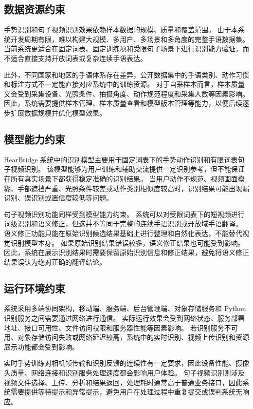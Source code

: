 \subsection{数据资源约束}

手势识别和句子视频识别效果依赖样本数据的规模、质量和覆盖范围。
由于本系统开发周期有限，难以构建大规模、多用户、多场景和多角度的完整手语数据集。
当前系统更适合在固定词表、固定训练项和受限句子场景下进行识别能力验证，而不适合直接支持开放词表或复杂连续手语表达。

此外，不同国家和地区的手语体系存在差异，公开数据集中的手语类别、动作习惯和标注方式不一定能直接对应系统中的训练资源。
对于自采样本而言，样本质量又会受到采集设备、光照条件、拍摄角度、动作规范程度和采集人数等因素影响。
因此，系统需要提供样本管理、样本质量查看和模型版本管理等能力，以便后续逐步扩展数据规模并优化模型效果。

\subsection{模型能力约束}

HearBridge 系统中的识别模型主要用于固定词表下的手势动作识别和有限词表句子视频识别。
该模型能够为用户训练和辅助交流提供一定识别参考，但不能保证在所有真实场景下都获得稳定准确的识别结果。
当用户动作不规范、视频画面模糊、手部遮挡严重、光照条件较差或动作类别相似度较高时，识别结果可能出现漏识别、误识别或置信度较低等问题。

句子视频识别功能同样受到模型能力约束。
系统可以对受限词表下的短视频进行词级识别和语义修正，但这并不等同于完整的连续手语识别或开放域手语翻译。
语义修正功能只能在原始识别候选结果基础上进行整理和自然化表达，不能替代视觉识别模型本身。
如果原始识别结果错误较多，语义修正结果也可能受到影响。
因此，系统在展示识别结果时需要保留原始识别信息和修正结果，避免将语义修正结果误认为绝对正确的翻译结论。

\subsection{运行环境约束}

系统采用多端协同架构，移动端、服务端、后台管理端、对象存储服务和 Python 识别服务之间需要通过网络进行通信。
实际运行效果会受到网络状态、服务部署地址、接口可用性、文件访问权限和服务器性能等因素影响。
若识别服务不可用、对象存储访问失败或网络延迟较高，系统中的实时识别、视频上传识别和资源展示功能都会受到影响。

实时手势训练对相机帧传输和识别反馈的连续性有一定要求，因此设备性能、摄像头质量、网络连接和识别服务处理速度都会影响用户体验。
句子视频识别则涉及视频文件选择、上传、分析和结果返回，处理耗时通常高于普通业务接口，因此系统需要提供等待提示和异常提示，避免用户在处理过程中重复提交或误判系统无响应。

